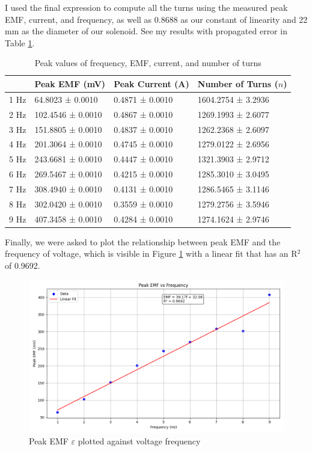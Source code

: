 \documentclass[12pt,letterpaper]{article}
\begin{document}
I used the final expression to compute all the turns using the measured peak EMF, current, and frequency, as well as 0.8688 as our constant of linearity and 22 mm as the diameter of our solenoid. See my results with propagated error in Table \ref{tab:turns}.

\begin{table}[ht]
\centering
\begin{tabular}{|l|l|l|l|}
\hline
  & Peak EMF (mV) & Peak Current (A) & Number of Turns ($n$) \\ \hline
1 Hz & 64.8023 ± 0.0010 & 0.4871 ± 0.0010 & 1604.2754 ± 3.2936 \\ \hline
2 Hz & 102.4546 ± 0.0010 & 0.4867 ± 0.0010 & 1269.1993 ± 2.6077 \\ \hline
3 Hz & 151.8805 ± 0.0010 & 0.4837 ± 0.0010 & 1262.2368 ± 2.6097 \\ \hline
4 Hz & 201.3064 ± 0.0010 & 0.4745 ± 0.0010 & 1279.0122 ± 2.6956 \\ \hline
5 Hz & 243.6681 ± 0.0010 & 0.4447 ± 0.0010 & 1321.3903 ± 2.9712 \\ \hline
6 Hz & 269.5467 ± 0.0010 & 0.4215 ± 0.0010 & 1285.3010 ± 3.0495 \\ \hline
7 Hz & 308.4940 ± 0.0010 & 0.4131 ± 0.0010 & 1286.5465 ± 3.1146 \\ \hline
8 Hz & 302.0420 ± 0.0010 & 0.3559 ± 0.0010 & 1279.2756 ± 3.5946 \\ \hline
9 Hz & 407.3458 ± 0.0010 & 0.4284 ± 0.0010 & 1274.1624 ± 2.9746 \\ \hline
\end{tabular}
\caption{Peak values of frequency, EMF, current, and number of turns}
\label{tab:turns}
\end{table}

Finally, we were asked to plot the relationship between peak EMF and the frequency of voltage, which is visible in Figure \ref{fig:emf} with a linear fit that has an R$^2$ of 0.9692.

\begin{figure}[ht]
    \centering
    \includegraphics[width=5in]{images/peak_emf_vs_frequency_fit.png}
    \caption{Peak EMF $\varepsilon$ plotted against voltage frequency}
    \label{fig:emf}
\end{figure}
\end{document}
